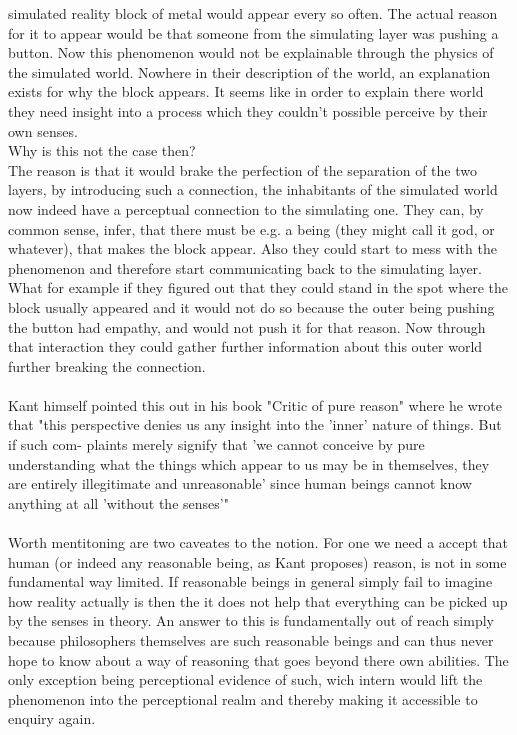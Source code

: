 \documentclass[fleqn,14pt]{article}
\begin{document}
simulated reality block of metal would appear every so often. The actual reason for it to appear would
be that someone from the simulating layer was pushing a button. Now this phenomenon would not be explainable
through the physics of the simulated world. Nowhere in their description of the world, an explanation
exists for why the block appears. It seems like in order to explain there world they need insight into
a process which they couldn't possible perceive by their own senses. \\
Why is this not the case then? \\
The reason is that it would brake the perfection of the separation of the two layers, by introducing such
a connection, the inhabitants of the simulated world now indeed have a perceptual connection to the simulating
one. They can, by common sense, infer, that there must be e.g. a being (they might call it god, or whatever), that
makes the block appear. Also they could start to mess with the phenomenon and therefore start communicating
back to the simulating layer. What for example if they figured out that they could stand in the spot where
the block usually appeared and it would not do so because the outer being pushing the button had empathy,
and would not push it for that reason. Now through that interaction they could gather further information
about this outer world further breaking the connection. \\
\\
Kant himself pointed this out in his book "Critic of pure reason" where he wrote that "this perspective
denies us any insight into the 'inner' nature of things. But if such com-
plaints merely signify that 'we cannot conceive by pure understanding
what the things which appear to us may be in themselves, they are
entirely illegitimate and unreasonable' since human beings cannot
know anything at all 'without the senses'"\cite[p.49]{otfried} \\
\\
Worth mentitoning are two caveates to the notion. For one we need a accept that human (or indeed any
reasonable being, as Kant proposes) reason, is not in some fundamental way limited. If reasonable
beings in general simply fail to imagine how reality actually is then the it does not help that everything
can be picked up by the senses in theory. An answer to this is fundamentally out of reach simply because
philosophers themselves are such reasonable beings and can thus never hope to know about a way of reasoning
that goes beyond there own abilities. The only exception being perceptional evidence of such, wich intern
would lift the phenomenon into the perceptional realm and thereby making it accessible to enquiry again.\\
\end{document}
